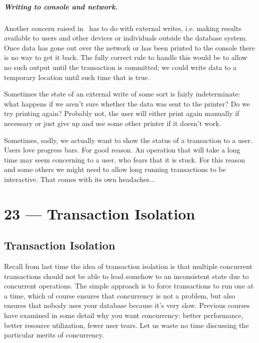 \documentclass[a4paper]{report}
\begin{document}
\paragraph{Writing to console and network.}

Another concern raised in~\cite{dsc} has to do with external writes, i.e. making results available to users and other devices or individuals outside the database system. Once data has gone out over the network or has been printed to the console there is no way to get it back. The fully correct rule to handle this would be to allow no such output until the transaction is committed; we could write data to a temporary location until such time that is true. 

Sometimes the state of an external write of some sort is fairly indeterminate: what happens if we aren't sure whether the data was sent to the printer? Do we try printing again? Probably not, the user will either print again manually if necessary or just give up and use some other printer if it doesn't work. 

Sometimes, sadly, we actually want to show the status of a transaction to a user. Users love progress bars. For good reason. An operation that will take a long time may seem concerning to a user, who fears that it is stuck. For this reason and some others we might need to allow long running transactions to be interactive. That comes with its own headaches...










\chapter*{23 --- Transaction Isolation}


\section*{Transaction Isolation}

Recall from last time the idea of transaction isolation is that multiple concurrent transactions should not be able to lead somehow to an inconsistent state due to concurrent operations. The simple approach is to force transactions to run one at a time, which of course ensures that concurrency is not a problem, but also ensures that nobody uses your database because it's very slow. Previous courses have examined in some detail why you want concurrency: better performance, better resource utilization, fewer user tears. Let us waste no time discussing the particular merits of concurrency. 
\end{document}

